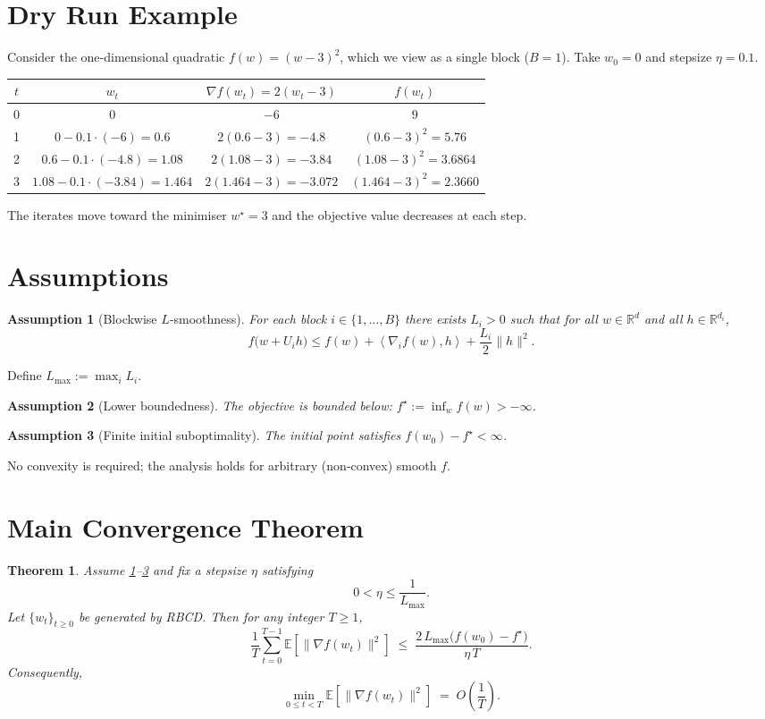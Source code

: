 \documentclass{article}
\newtheorem{theorem}{Theorem}
\newtheorem{assumption}{Assumption}
\newcommand{\E}{\mathbb{E}}
\newcommand{\ip}[2]{\left\langle #1,#2 \right\rangle}
\begin{document}
\section*{Dry Run Example}
Consider the one‑dimensional quadratic $f(w)=(w-3)^2$, which we view as a single block ($B=1$).  
Take $w_0=0$ and stepsize $\eta=0.1$.

\begin{center}
\begin{tabular}{c|c|c|c}
$t$ & $w_t$ & $\nabla f(w_t)=2(w_t-3)$ & $f(w_t)$ \\ \hline
0 & $0$ & $-6$ & $9$\\
1 & $0-0.1\cdot(-6)=0.6$ & $2(0.6-3)=-4.8$ & $(0.6-3)^2=5.76$\\
2 & $0.6-0.1\cdot(-4.8)=1.08$ & $2(1.08-3)=-3.84$ & $(1.08-3)^2=3.6864$\\
3 & $1.08-0.1\cdot(-3.84)=1.464$ & $2(1.464-3)=-3.072$ & $(1.464-3)^2=2.3660$
\end{tabular}
\end{center}
The iterates move toward the minimiser $w^\star=3$ and the objective value decreases at each step.

\newpage
\section*{Assumptions}
\begin{assumption}[Blockwise $L$‑smoothness]\label{ass:smooth}
For each block $i\in\{1,\dots ,B\}$ there exists $L_i>0$ such that for all $w\in\mathbb{R}^d$ and all $h\in\mathbb{R}^{d_i}$,
\[
f\bigl(w+U_i h\bigr)\le f(w)+\ip{\nabla_i f(w)}{h}+\frac{L_i}{2}\|h\|^2 .
\tag{2}
\]
\end{assumption}
Define $L_{\max}:=\max_i L_i$.

\begin{assumption}[Lower boundedness]\label{ass:lb}
The objective is bounded below: $f^\star:=\inf_{w}f(w)>-\infty$.
\end{assumption}

\begin{assumption}[Finite initial suboptimality]\label{ass:init}
The initial point satisfies $f(w_0)-f^\star<\infty$.
\end{assumption}

No convexity is required; the analysis holds for arbitrary (non‑convex) smooth $f$.

\section*{Main Convergence Theorem}
\begin{theorem}\label{thm:main}
Assume \ref{ass:smooth}–\ref{ass:init} and fix a stepsize $\eta$ satisfying
\[
0<\eta\le \frac{1}{L_{\max}} .
\tag{3}
\]
Let $\{w_t\}_{t\ge0}$ be generated by RBCD. Then for any integer $T\ge1$,
\[
\frac{1}{T}\sum_{t=0}^{T-1}\E\!\left[\bigl\|\nabla f(w_t)\bigr\|^2\right]
\;\le\;
\frac{2\,L_{\max}\bigl(f(w_0)-f^\star\bigr)}{\eta\,T}.
\tag{4}
\]
Consequently,
\[
\min_{0\le t<T}\E\!\left[\bigl\|\nabla f(w_t)\bigr\|^2\right]
\;=\; O\!\left(\frac{1}{T}\right).
\]
\end{theorem}
\end{document}

